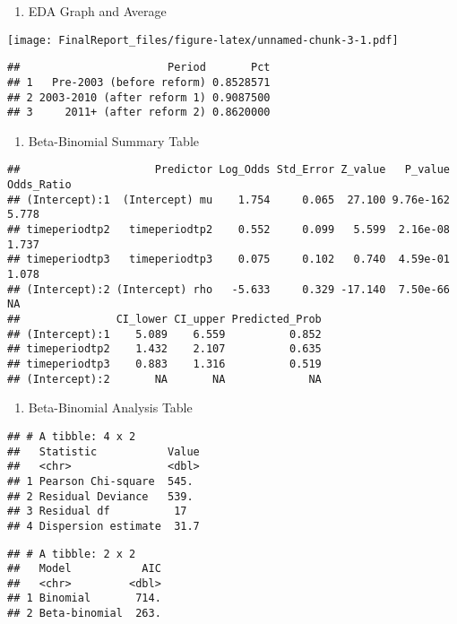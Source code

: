 \documentclass[
]{article}
\providecommand{\tightlist}{%
  \setlength{\itemsep}{0pt}\setlength{\parskip}{0pt}}
\begin{document}
\begin{enumerate}
\def\labelenumi{\arabic{enumi}.}
\setcounter{enumi}{1}
\tightlist
\item
  EDA Graph and Average
\end{enumerate}

\texttt{[image: FinalReport\_files/figure-latex/unnamed-chunk-3-1.pdf]}

\begin{verbatim}
##                       Period       Pct
## 1   Pre-2003 (before reform) 0.8528571
## 2 2003-2010 (after reform 1) 0.9087500
## 3     2011+ (after reform 2) 0.8620000
\end{verbatim}

\begin{enumerate}
\def\labelenumi{\arabic{enumi}.}
\setcounter{enumi}{2}
\tightlist
\item
  Beta-Binomial Summary Table
\end{enumerate}

\begin{verbatim}
##                     Predictor Log_Odds Std_Error Z_value   P_value Odds_Ratio
## (Intercept):1  (Intercept) mu    1.754     0.065  27.100 9.76e-162      5.778
## timeperiodtp2   timeperiodtp2    0.552     0.099   5.599  2.16e-08      1.737
## timeperiodtp3   timeperiodtp3    0.075     0.102   0.740  4.59e-01      1.078
## (Intercept):2 (Intercept) rho   -5.633     0.329 -17.140  7.50e-66         NA
##               CI_lower CI_upper Predicted_Prob
## (Intercept):1    5.089    6.559          0.852
## timeperiodtp2    1.432    2.107          0.635
## timeperiodtp3    0.883    1.316          0.519
## (Intercept):2       NA       NA             NA
\end{verbatim}

\begin{enumerate}
\def\labelenumi{\arabic{enumi}.}
\setcounter{enumi}{3}
\tightlist
\item
  Beta-Binomial Analysis Table
\end{enumerate}

\begin{verbatim}
## # A tibble: 4 x 2
##   Statistic           Value
##   <chr>               <dbl>
## 1 Pearson Chi-square  545. 
## 2 Residual Deviance   539. 
## 3 Residual df          17  
## 4 Dispersion estimate  31.7
\end{verbatim}

\begin{verbatim}
## # A tibble: 2 x 2
##   Model           AIC
##   <chr>         <dbl>
## 1 Binomial       714.
## 2 Beta-binomial  263.
\end{verbatim}
\end{document}
